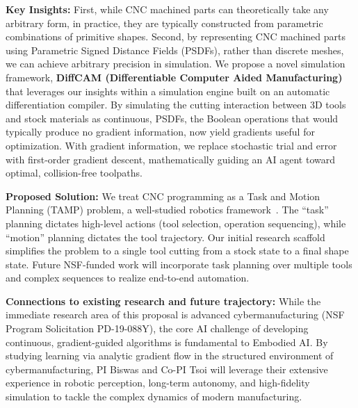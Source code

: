 \documentclass[11pt, letterpaper]{article}
\begin{document}
\textbf{Key Insights:}
First, while CNC machined parts can theoretically take any arbitrary form, in practice, they are typically constructed from parametric combinations of primitive shapes.
Second, by representing CNC machined parts using Parametric Signed Distance Fields (PSDFs), rather than discrete meshes, we can achieve arbitrary precision in simulation.
We propose a novel simulation framework, \textbf{DiffCAM (Differentiable Computer Aided Manufacturing)} that leverages our insights within a simulation engine built on an automatic differentiation compiler.
By simulating the cutting interaction between 3D tools and stock materials as continuous, PSDFs, the Boolean operations that would typically produce no gradient information, now yield gradients useful for optimization.
With gradient information, we replace stochastic trial and error with first-order gradient descent, mathematically guiding an AI agent toward optimal, collision-free toolpaths.

\textbf{Proposed Solution:}
We treat CNC programming as a Task and Motion Planning (TAMP) problem, a well-studied robotics framework~\cite{garrett2021integrated}.
The ``task'' planning dictates high-level actions (tool selection, operation sequencing), while ``motion'' planning dictates the tool trajectory.
Our initial research scaffold simplifies the problem to a single tool cutting from a stock state to a final shape state.
Future NSF-funded work will incorporate task planning over multiple tools and complex sequences to realize end-to-end automation.

\textbf{Connections to existing research and future trajectory:}
While the immediate research area of this proposal is advanced cybermanufacturing (NSF Program Solicitation PD-19-088Y), the core AI challenge of developing continuous, gradient-guided algorithms is fundamental to Embodied AI.
By studying learning via analytic gradient flow in the structured environment of cybermanufacturing, PI Biswas and Co-PI Tsoi will leverage their extensive experience in robotic perception, long-term autonomy, and high-fidelity simulation to tackle the complex dynamics of modern manufacturing.
\end{document}
